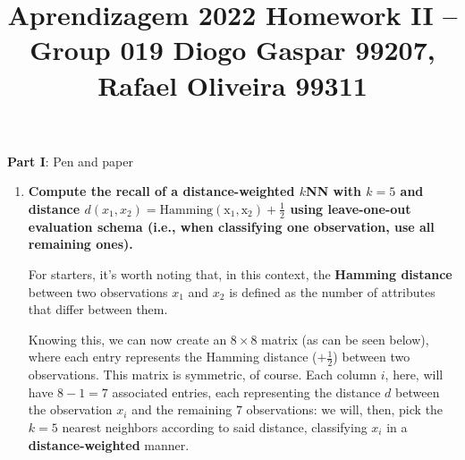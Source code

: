 \documentclass[12pt]{article}
\title{\large{Aprendizagem 2022}\vskip 0.2cm Homework II -- Group 019\vskip 0.2cm Diogo Gaspar 99207, Rafael Oliveira 99311}
\date{}
\begin{document}
\maketitle
\center\large{\vskip -2.5cm\textbf{Part I}: Pen and paper}
\begin{enumerate}[leftmargin=\labelsep]

  \item \textbf{Compute the recall of a distance-weighted $k$NN with $k=5$ and distance
          $d(x_1, x_2) = \operatorname{Hamming(x_1, x_2)} + \frac{1}{2}$ using leave-one-out
          evaluation schema (i.e., when classifying one observation, use all remaining ones).}

        For starters, it's worth noting that, in this context, the \textbf{Hamming distance} between two
        observations $x_1$ and $x_2$ is defined as the number of attributes that differ between them.

        Knowing this, we can now create an $8 \times 8$ matrix (as can be seen below), where each entry
        represents the Hamming distance ($+ \frac{1}{2}$) between two observations. This matrix is symmetric, of course.
        Each column $i$, here, will have $8 - 1 = 7$ associated entries, each representing the distance $d$
        between the observation $x_i$ and the remaining $7$ observations: we will, then,
        pick the $k = 5$ nearest neighbors according to said distance, classifying $x_i$
        in a \textbf{distance-weighted} manner.


\end{enumerate}
\end{document}
